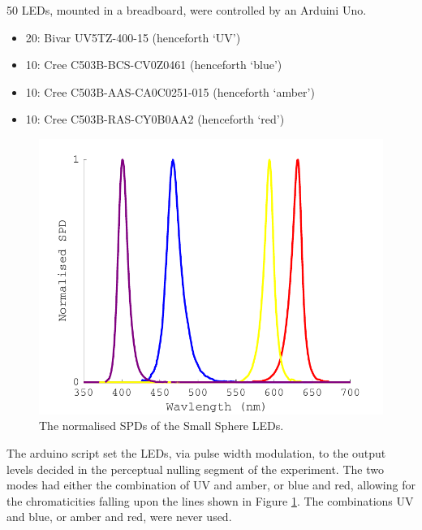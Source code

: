 50 LEDs, mounted in a breadboard, were controlled by an Arduini Uno. %

\begin{itemize}
    \item 20: Bivar UV5TZ-400-15 (henceforth `UV')
    \item 10: Cree C503B-BCS-CV0Z0461 (henceforth `blue')
    \item 10: Cree C503B-AAS-CA0C0251-015 (henceforth `amber')
    \item 10: Cree C503B-RAS-CY0B0AA2 (henceforth `red')
\end{itemize}


\begin{figure}[htbp]
\includegraphics[max width=\textwidth,center]{figs/SmallSphere/LED_SPDs.pdf}
\caption{The normalised \glspl{SPD} of the Small Sphere \glspl{LED}.}
\label{fig:LED_SPDs}
\end{figure}

The arduino script set the \glspl{LED}, via pulse width modulation, to the output levels decided in the perceptual nulling segment of the experiment. The two modes had either the combination of UV and amber, or blue and red, allowing for the chromaticities falling upon the lines shown in Figure \ref{fig:LED_SPDs}. The combinations UV and blue, or amber and red, were never used.

